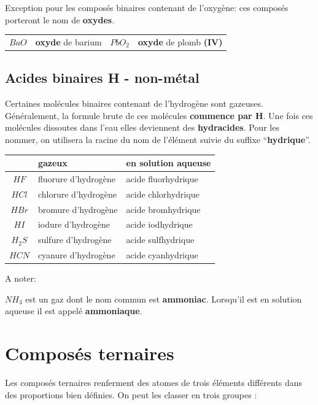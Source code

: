 \documentclass[
  11pt,
  a4paper,
  openany]{book}
\begin{document}
Exception pour les composés binaires contenant de l'oxygène: ces composés porteront le nom de \textbf{oxydes}.

\begin{longtable}[]{@{}clcl@{}}
\toprule\noalign{}
\endhead
\bottomrule\noalign{}
\endlastfoot
\(BaO\) & \textbf{oxyde} de barium & \(PbO_2\) & \textbf{oxyde} de plomb \textbf{(IV)} \\
\end{longtable}

\subsection{Acides binaires \textbar{} H - non-métal}\label{acides-binaires-h---non-muxe9tal}

Certaines molécules binaires contenant de l'hydrogène sont gazeuses. Généralement, la formule brute de ces molécules \textbf{commence par H}. Une fois ces molécules dissoutes dans l'eau elles deviennent des \textbf{hydracides}. Pour les nommer, on utilisera la racine du nom de l'élément suivie du suffixe ``\textbf{hydrique}''.

\begin{longtable}[]{@{}cll@{}}
\toprule\noalign{}
& gazeux & en solution aqueuse \\
\midrule\noalign{}
\endhead
\bottomrule\noalign{}
\endlastfoot
\(HF\) & fluorure d'hydrogène & acide fluorhydrique \\
\(HCl\) & chlorure d'hydrogène & acide chlorhydrique \\
\(HBr\) & bromure d'hydrogène & acide bromhydrique \\
\(HI\) & iodure d'hydrogène & acide iodhydrique \\
\(H_2S\) & sulfure d'hydrogène & acide sulfhydrique \\
\(HCN\) & cyanure d'hydrogène & acide cyanhydrique \\
\end{longtable}

A noter:

\(NH_3\) est un gaz dont le nom commun est \textbf{ammoniac}. Lorsqu'il est en solution aqueuse il est appelé \textbf{ammoniaque}.

\section{Composés ternaires}\label{composuxe9s-ternaires}

Les composés ternaires renferment des atomes de trois éléments différents dans des proportions bien définies. On peut les classer en trois groupes :
\end{document}
